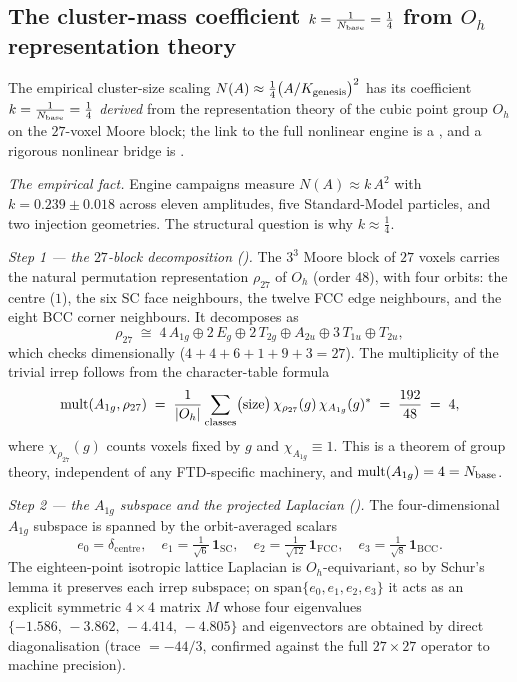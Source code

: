 \subsection{The cluster-mass coefficient $k=\tfrac{1}{N_{\mathrm{base}}}=\tfrac14$ from $O_h$ representation theory}
\label{sec:clustermass}

\begin{claim}
The empirical cluster-size scaling $N(A)\approx \tfrac14\bigl(A/K_{\mathrm{genesis}}\bigr)^2$ has its coefficient
$k=\tfrac{1}{N_{\mathrm{base}}}=\tfrac14$ \emph{derived} from the representation theory of the cubic point
group $O_h$ on the $27$-voxel Moore block; the link to the full nonlinear engine
is a , and a rigorous nonlinear bridge is .
\end{claim}

\emph{The empirical fact.} Engine campaigns measure $N(A) \approx k\,A^2$ with
$k = 0.239 \pm 0.018$ across eleven amplitudes, five Standard-Model particles,
and two injection geometries. The structural question is why $k \approx \tfrac14$.

\emph{Step 1 --- the $27$-block decomposition ().} The $3^3$ Moore block
of $27$ voxels carries the natural permutation representation $\rho_{27}$ of $O_h$
(order $48$), with four orbits: the centre ($1$), the six SC face neighbours, the
twelve FCC edge neighbours, and the eight BCC corner neighbours. It decomposes as
\[
  \rho_{27} \;\cong\; 4\,A_{1g} \oplus 2\,E_g \oplus 2\,T_{2g}
            \oplus A_{2u} \oplus 3\,T_{1u} \oplus T_{2u},
\]
which checks dimensionally ($4 + 4 + 6 + 1 + 9 + 3 = 27$). The multiplicity of
the trivial irrep follows from the character-table formula
\[
  \operatorname{mult}(A_{1g},\rho_{27})
  \;=\; \frac{1}{|O_h|}\sum_{\text{classes}}
        \bigl(\text{size}\bigr)\,\chi_{\rho_{27}}(g)\,\chi_{A_{1g}}(g)^{*}
  \;=\; \frac{192}{48} \;=\; 4 ,
\]
where $\chi_{\rho_{27}}(g)$ counts voxels fixed by $g$ and $\chi_{A_{1g}}\equiv 1$.
This is a theorem of group theory, independent of any FTD-specific machinery, and
$\operatorname{mult}(A_{1g}) = 4 = N_{\mathrm{base}}$.

\emph{Step 2 --- the $A_{1g}$ subspace and the projected Laplacian ().}
The four-dimensional $A_{1g}$ subspace is spanned by the orbit-averaged scalars
\[
  e_0 = \delta_{\text{centre}}, \quad
  e_1 = \tfrac{1}{\sqrt6}\,\mathbf{1}_{\mathrm{SC}}, \quad
  e_2 = \tfrac{1}{\sqrt{12}}\,\mathbf{1}_{\mathrm{FCC}}, \quad
  e_3 = \tfrac{1}{\sqrt8}\,\mathbf{1}_{\mathrm{BCC}}.
\]
The eighteen-point isotropic lattice Laplacian is $O_h$-equivariant, so by Schur's
lemma it preserves each irrep subspace; on $\mathrm{span}\{e_0,e_1,e_2,e_3\}$ it
acts as an explicit symmetric $4\times4$ matrix $M$ whose four eigenvalues
$\{-1.586,\,-3.862,\,-4.414,\,-4.805\}$ and eigenvectors are obtained by direct
diagonalisation (trace $= -44/3$, confirmed against the full $27\times27$
operator to machine precision).

